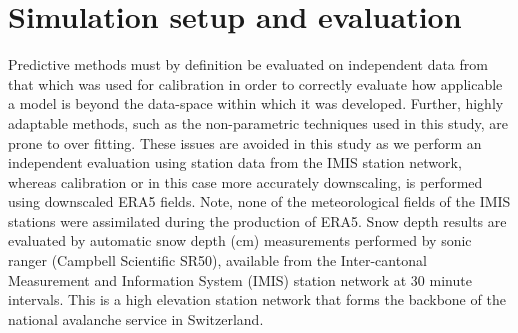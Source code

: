\documentclass[hess, manuscript]{copernicus}
\begin{document}
\section{Simulation setup and evaluation}

 Predictive methods must by definition be evaluated on independent data from that which was used for calibration in order to correctly evaluate how applicable a model is beyond the data-space within which it was developed. Further, highly adaptable methods, such as the non-parametric techniques used in this study, are prone to over fitting. These issues are avoided in this study as we perform an independent evaluation using station data from the IMIS station network, whereas calibration or in this case more accurately downscaling, is performed using downscaled ERA5 fields. Note, none of the meteorological fields of the IMIS stations were assimilated during the production of ERA5.
 Snow depth results are evaluated by automatic snow depth (cm) measurements performed by sonic ranger (Campbell Scientific SR50), available from the Inter-cantonal Measurement and Information System (IMIS) station network at 30 minute intervals. This is a high elevation station network that forms the backbone of the national avalanche service in Switzerland.
 
\end{document}
